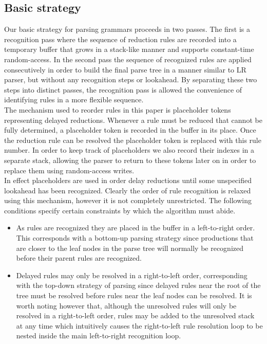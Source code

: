 \documentclass[11pt]{article}
\begin{document}
\subsection{Basic strategy}
Our basic strategy for parsing grammars proceeds in two passes.
The first is a recognition pass where the sequence of reduction rules are recorded into a temporary buffer that grows in a stack-like manner and supports constant-time random-access.
In the second pass the sequence of recognized rules are applied consecutively in order to build the final parse tree in a manner similar to LR parser, but without any recognition steps or lookahead.
By separating these two steps into distinct passes, the recognition pass is allowed the convenience of identifying rules in a more flexible sequence.\\

The mechanism used to reorder rules in this paper is placeholder tokens representing delayed reductions.
Whenever a rule must be reduced that cannot be fully determined, a placeholder token is recorded in the buffer in its place. 
Once the reduction rule can be resolved the placeholder token is replaced with this rule number.
In order to keep track of placeholders we also record their indexes in a separate stack, allowing the parser to return to these tokens later on in order to replace them using random-access writes.\\

In effect placeholders are used in order delay reductions until some unspecified lookahead has been recognized.
Clearly the order of rule recognition is relaxed using this mechanism, however it is not completely unrestricted. 
The following conditions specify certain constraints by which the algorithm must abide.

\begin{itemize}
\item As rules are recognized they are placed in the buffer in a left-to-right order. This corresponds with a bottom-up parsing strategy since productions that are closer to the leaf nodes in the parse tree will normally be recognized before their parent rules are recognized.
\item Delayed rules may only be resolved in a right-to-left order, corresponding with the top-down strategy of parsing since delayed rules near the root of the tree must be resolved before 
rules near the leaf nodes can be resolved. 
It is worth noting however that, although the unresolved rules will only be resolved in a right-to-left order, rules may be added to the unresolved stack at any time which intuitively
causes the right-to-left rule resolution loop to be nested inside the main left-to-right recognition loop.
\end{itemize}
\end{document}
